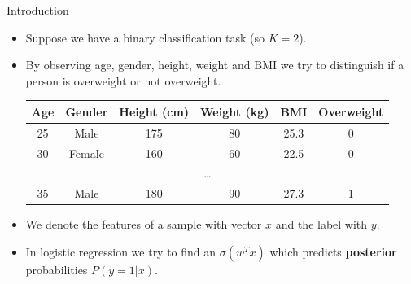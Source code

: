 \documentclass[serif, aspectratio=169]{beamer}
\begin{document}
\begin{frame}{Introduction}
    \begin{itemize}
        \item Suppose we have a binary classification task (so $K=2$).
        \item By observing \textcolor{deepred}{age}, \textcolor{deepred}{gender}, \textcolor{deepred}{height}, \textcolor{deepred}{weight} and \textcolor{deepred}{BMI} we try to distinguish if a person is \textcolor{deepgreen}{overweight} or \textcolor{deepgreen}{not overweight}.
        
        
        \begin{table}[h!]
        \centering
        \begin{tabular}{|c|c|c|c|c|c|}
        \hline
        \textcolor{deepred}{Age} & \textcolor{deepred}{Gender} & \textcolor{deepred}{Height (cm)} & \textcolor{deepred}{Weight (kg)} & \textcolor{deepred}{BMI} & \textcolor{deepgreen}{Overweight} \\ \hline
        25 & Male & 175 & 80 & 25.3 & 0 \\ \hline
        30 & Female & 160 & 60 & 22.5 & 0 \\ \hline
        \multicolumn{6}{|c|}{\dots} \\ \hline
        35 & Male & 180 & 90 & 27.3 & 1 \\ \hline
        \end{tabular}
        \end{table}
        \item We denote the \textcolor{deepred}{features} of a sample with vector $x$ and the \textcolor{deepgreen}{label} with $y$.
        \item In logistic regression we try to find an $\sigma (w^Tx)$ which predicts \textbf{posterior} probabilities $P(y=1|x)$.
    \end{itemize}
    
\end{frame}
\end{document}
